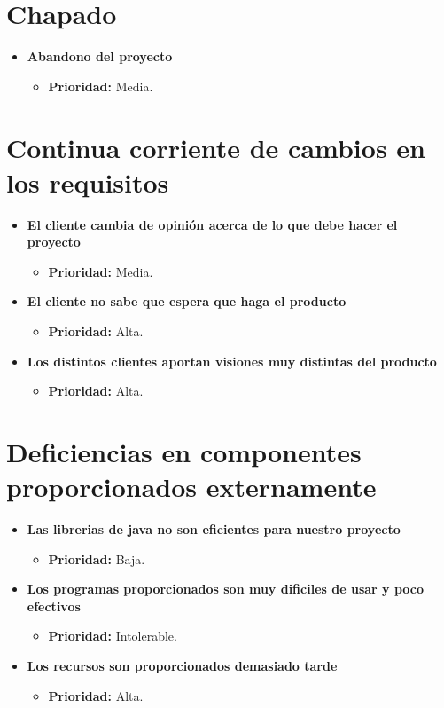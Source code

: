 \documentclass[spanish,a4paper,12pt]{report}	%
\begin{document}
\section{Chapado}
	\begin{itemize}
		\item \textbf{Abandono del proyecto}
			\begin{itemize}
				\item \textbf{Prioridad: }Media.			%
			\end{itemize}
	\end{itemize}
%
\section{Continua corriente de cambios en los requisitos}
	\begin{itemize}
		\item \textbf{El cliente cambia de opinión acerca de lo que debe hacer el proyecto}
			\begin{itemize}
				\item \textbf{Prioridad: }Media.
			\end{itemize}
		
		\item \textbf{El cliente no sabe que espera que haga el producto}	
			\begin{itemize}
				\item \textbf{Prioridad: }Alta.
			\end{itemize}
		
		\item \textbf{Los distintos clientes aportan visiones muy distintas del producto}	
			\begin{itemize}
				\item \textbf{Prioridad: }Alta.
			\end{itemize}
	\end{itemize}
%
\section{Deficiencias en componentes proporcionados externamente}
	\begin{itemize}
		\item \textbf{Las librerias de java no son eficientes para nuestro proyecto}	
			\begin{itemize}
				\item \textbf{Prioridad: }Baja.
			\end{itemize}
		
		\item \textbf{Los programas proporcionados son muy dificiles de usar y poco efectivos}	
			\begin{itemize}
				\item \textbf{Prioridad: }Intolerable.
			\end{itemize}
		
		\item \textbf{Los recursos son proporcionados demasiado tarde}	
			\begin{itemize}
				\item \textbf{Prioridad: }Alta.
			\end{itemize}
	\end{itemize}
%
\end{document}
